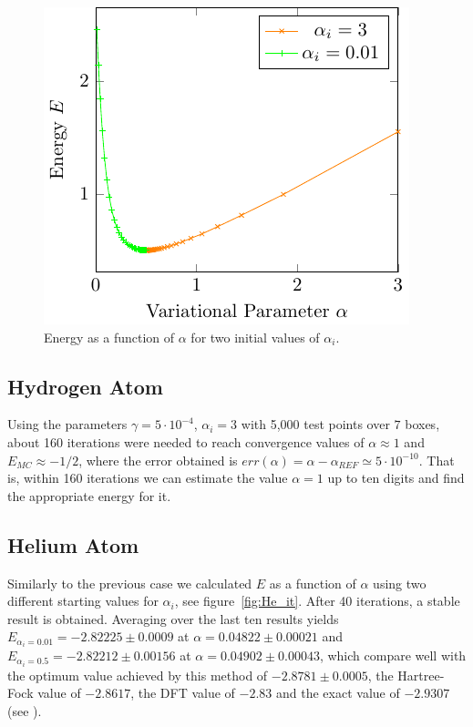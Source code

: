 \begin{figure}[th]
	\begin{center}
		\includegraphics[scale=0.9]{graphs/ho-e-alpha.pdf}
		\caption{
			Energy as a function of $\alpha$ for two initial values of $\alpha_i$.
		}
		\label{fig:Ho_rel}
	\end{center}
\end{figure}


\subsection{Hydrogen Atom}
Using the parameters
$\gamma = 5\cdot 10^{-4}$, $\alpha_i = 3 $ with 5,000
test points over $7$ boxes, about 160 iterations were needed to reach convergence
values of $\alpha \approx 1$ and $E_{MC} \approx - 1/2$, where the error obtained is
$err(\alpha) = \alpha-\alpha_{REF} \simeq 5 \cdot 10^{-10}$. That is, within 160
iterations we can estimate the value $\alpha=1$ up to ten digits and find the appropriate energy for it.


\subsection{Helium Atom}
Similarly to the previous case we calculated $E$ as a function of $\alpha$
using two different starting values for $\alpha_i$, see figure~\ref{fig:He_it}.
After 40 iterations, a stable result is obtained. Averaging over the last ten results yields
$E_{\alpha_i = 0.01} = -2.82225\pm 0.0009$ at $\alpha = 0.04822 \pm 0.00021 $ and $E_{\alpha_i = 0.5} =  -2.82212\pm 0.00156$ at $\alpha=0.04902\pm 0.00043$, which
compare well with the optimum value achieved by this method of $-2.8781 \pm 0.0005$, the Hartree-Fock value of $-2.8617$,
the DFT value of $-2.83$ and the exact value of $-2.9307$ (see \cite{JosBook}).

